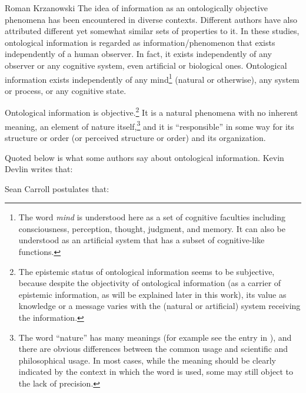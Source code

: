 \begin{artengenv}{Roman Krzanowski}
The idea of information as an ontologically objective phenomena has been encountered in diverse contexts. Different authors have also attributed different yet somewhat similar sets of properties to it. In these studies, ontological information is regarded as information/phenomenon that exists independently of a human observer. In fact, it exists independently of any observer or any cognitive system, even artificial or biological ones. Ontological information exists independently of any mind\footnote{The word \textit{mind} is understood here as a set of cognitive faculties including consciousness, perception, thought, judgment, and memory. It can also be understood as an artificial system that has a subset of cognitive-like functions.} (natural or otherwise), any system or process, or any cognitive state.

Ontological information is objective.\footnote{The epistemic status of ontological information seems to be subjective, because despite the objectivity of ontological information (as a carrier of epistemic information, as will be explained later in this work), its value as knowledge or a message varies with the (natural or artificial) system receiving the information.}
It is a natural phenomena with no inherent meaning, an element of nature itself,\footnote{The word ``nature'' has many meanings (for example see the entry in
\parencite[][]{honderich_oxford_1995}%
), and there are obvious differences between the common usage and scientific and philosophical usage. In most cases, while the meaning should be clearly indicated by the context in which the word is used, some may still object to the lack of precision.} and it is ``responsible'' in some way for its structure or order (or perceived structure or order) and its organization.

Quoted below is what some authors say about ontological information. Kevin Devlin
\parencite*[][p.2]{devlin_logic_1991} %
 writes that:



Sean Carroll
\parencite*[][p.296]{carroll_big_2017} %
 postulates that:


\end{artengenv}
